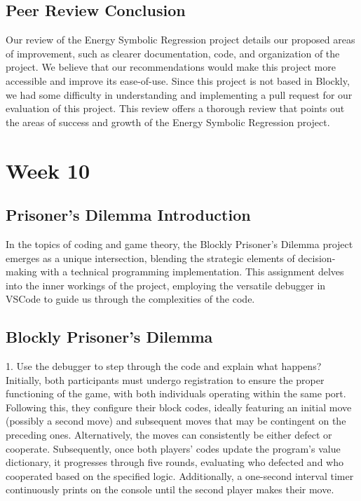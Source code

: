 \documentclass{article}
\theoremstyle{theorem}
\theoremstyle{definition}
\theoremstyle{remark}
\begin{document}
\subsection{Peer Review Conclusion}

Our review of the Energy Symbolic Regression project details our proposed areas of improvement, such as clearer documentation, code, and organization of the project. We believe that our recommendations would make this project more accessible and improve its ease-of-use. Since this project is not based in Blockly, we had some difficulty in understanding and implementing a pull request for our evaluation of this project. This review offers a thorough review that points out the areas of success and growth of the Energy Symbolic Regression project. 

\section{Week 10}

\subsection{Prisoner's Dilemma Introduction}

In the topics of coding and game theory, the Blockly Prisoner's Dilemma project emerges as a unique intersection, blending the strategic elements of decision-making with a technical programming implementation. This assignment delves into the inner workings of the project, employing the versatile debugger in VSCode to guide us through the complexities of the code.

\subsection{Blockly Prisoner's Dilemma}

1. Use the debugger to step through the code and explain what happens? \\

Initially, both participants must undergo registration to ensure the proper functioning of the game, with both individuals operating within the same port. Following this, they configure their block codes, ideally featuring an initial move (possibly a second move) and subsequent moves that may be contingent on the preceding ones. Alternatively, the moves can consistently be either defect or cooperate. Subsequently, once both players' codes update the program's value dictionary, it progresses through five rounds, evaluating who defected and who cooperated based on the specified logic. Additionally, a one-second interval timer continuously prints on the console until the second player makes their move. \\
\end{document}
